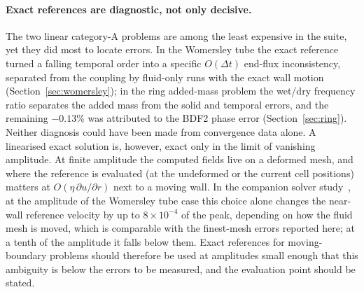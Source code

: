 \paragraph{Exact references are diagnostic, not only decisive.}
The two linear category-A problems are among the least expensive in the suite, yet they did most to locate errors.
In the Womersley tube the exact reference turned a falling temporal order into a specific $O(\Delta t)$ end-flux inconsistency, separated from the coupling by fluid-only runs with the exact wall motion (Section~\ref{sec:womersley}); in the ring added-mass problem the wet/dry frequency ratio separates the added mass from the solid and temporal errors, and the remaining $-0.13\%$ was attributed to the BDF2 phase error (Section~\ref{sec:ring}).
Neither diagnosis could have been made from convergence data alone.
A linearised exact solution is, however, exact only in the limit of vanishing amplitude.
At finite amplitude the computed fields live on a deformed mesh, and where the reference is evaluated (at the undeformed or the current cell positions) matters at $O(\eta\,\partial u/\partial r)$ next to a moving wall.
In the companion solver study~\citep{CardiffBatistic2026QM}, at the amplitude of the Womersley tube case this choice alone changes the near-wall reference velocity by up to $8\times10^{-4}$ of the peak, depending on how the fluid mesh is moved, which is comparable with the finest-mesh errors reported here; at a tenth of the amplitude it falls below them.
Exact references for moving-boundary problems should therefore be used at amplitudes small enough that this ambiguity is below the errors to be measured, and the evaluation point should be stated.


